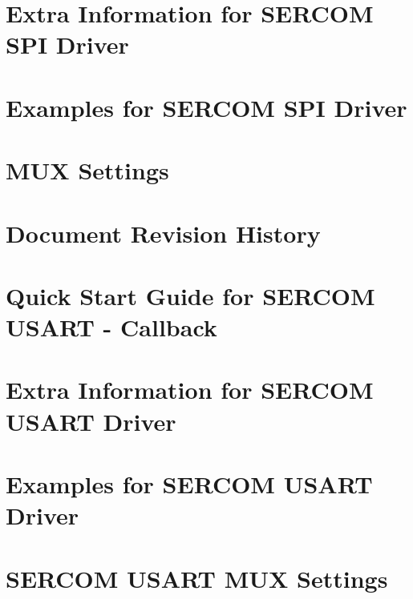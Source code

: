 \let\mypdfximage\pdfximage\def\pdfximage{\immediate\mypdfximage}\documentclass[twoside]{book}
\newcommand{\+}{\discretionary{\mbox{\scriptsize$\hookleftarrow$}}{}{}}
\begin{document}
\chapter{Extra Information for S\+E\+R\+C\+OM S\+PI Driver}
\label{asfdoc_sam0_sercom_spi_extra}

\chapter{Examples for S\+E\+R\+C\+OM S\+PI Driver}
\label{asfdoc_sam0_sercom_spi_exqsg}

\chapter{M\+UX Settings}
\label{asfdoc_sam0_sercom_spi_mux_settings}

\chapter{Document Revision History}
\label{asfdoc_sam0_sercom_spi_document_revision_history}

\chapter{Quick Start Guide for S\+E\+R\+C\+OM U\+S\+A\+RT -\/ Callback}
\label{asfdoc_sam0_sercom_usart_callback_use_case}

\chapter{Extra Information for S\+E\+R\+C\+OM U\+S\+A\+RT Driver}
\label{asfdoc_sam0_sercom_usart_extra}

\chapter{Examples for S\+E\+R\+C\+OM U\+S\+A\+RT Driver}
\label{asfdoc_sam0_sercom_usart_exqsg}

\chapter{S\+E\+R\+C\+OM U\+S\+A\+RT M\+UX Settings}
\label{asfdoc_sam0_sercom_usart_mux_settings}

\end{document}
